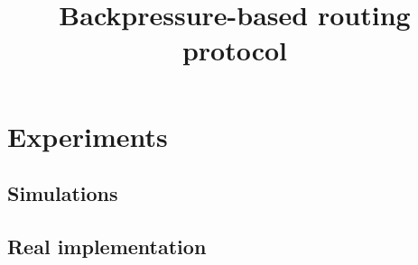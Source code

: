 \documentclass[12pt, a4paper, twocolumn]{article}
\begin{document}
\title{\bf{Backpressure-based routing protocol}}
\date{}
\maketitle






\section{Experiments}
\subsection{Simulations}
\subsection{Real implementation}
%


\end{document}
